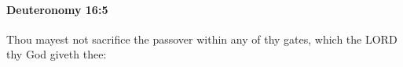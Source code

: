 
		\paragraph{Deuteronomy 16:5} %
			\label{DEUTERONOMY-16-5}

			Thou mayest not sacrifice the passover within any of thy gates, which the LORD thy God giveth thee:


